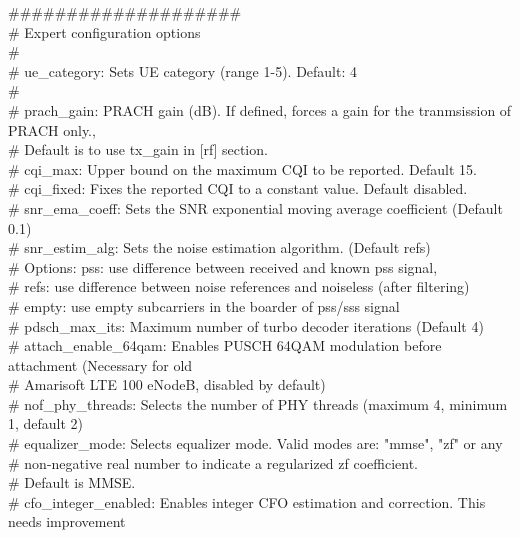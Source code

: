 \#\#\#\#\#\#\#\#\#\#\#\#\#\#\#\#\#\#\#\#  \\
\# Expert configuration options  \\
\#  \\
\# ue\_category:          Sets UE category (range 1-5). Default: 4   \\
\#  \\
\# prach\_gain:           PRACH gain (dB). If defined, forces a gain for the tranmsission of PRACH only.,   \\
\#                       Default is to use tx\_gain in $[$rf$]$ section.   \\
\# cqi\_max:              Upper bound on the maximum CQI to be reported. Default 15.   \\
\# cqi\_fixed:            Fixes the reported CQI to a constant value. Default disabled.  \\
\# snr\_ema\_coeff:        Sets the SNR exponential moving average coefficient (Default 0.1)  \\
\# snr\_estim\_alg:        Sets the noise estimation algorithm. (Default refs)  \\
\#                          Options: pss:   use difference between received and known pss signal,   \\
\#                                   refs:  use difference between noise references and noiseless (after filtering) \\  
\#                                   empty: use empty subcarriers in the boarder of pss/sss signal  \\
\# pdsch\_max\_its:        Maximum number of turbo decoder iterations (Default 4)  \\
\# attach\_enable\_64qam:  Enables PUSCH 64QAM modulation before attachment (Necessary for old   \\
\#                        Amarisoft LTE 100 eNodeB, disabled by default)  \\
\# nof\_phy\_threads:      Selects the number of PHY threads (maximum 4, minimum 1, default 2)  \\
\# equalizer\_mode:       Selects equalizer mode. Valid modes are: "mmse", "zf" or any   \\
\#                       non-negative real number to indicate a regularized zf coefficient.  \\
\#                       Default is MMSE.   \\
\# cfo\_integer\_enabled:  Enables integer CFO estimation and correction. This needs improvement \\ 
